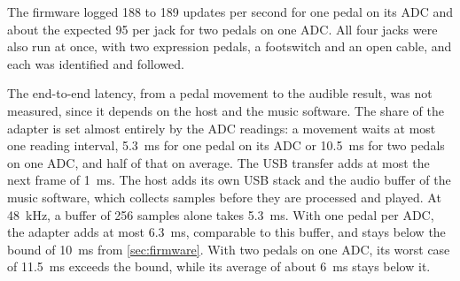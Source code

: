 The firmware logged 188 to 189 updates per second for one pedal on its ADC and about the expected 95 per jack for two pedals on one ADC. All four jacks were also run at once, with two expression pedals, a footswitch and an open cable, and each was identified and followed.

The end-to-end latency, from a pedal movement to the audible result, was not measured, since it depends on the host and the music software. The share of the adapter is set almost entirely by the ADC readings: a movement waits at most one reading interval, \qty{5.3}{\milli\second} for one pedal on its ADC or \qty{10.5}{\milli\second} for two pedals on one ADC, and half of that on average. The USB transfer adds at most the next frame of \qty{1}{\milli\second}. The host adds its own USB stack and the audio buffer of the music software, which collects samples before they are processed and played. At \qty{48}{\kilo\hertz}, a buffer of 256 samples alone takes \qty{5.3}{\milli\second}. With one pedal per ADC, the adapter adds at most \qty{6.3}{\milli\second}, comparable to this buffer, and stays below the bound of \qty{10}{\milli\second} from \cref{sec:firmware}. With two pedals on one ADC, its worst case of \qty{11.5}{\milli\second} exceeds the bound, while its average of about \qty{6}{\milli\second} stays below it.
